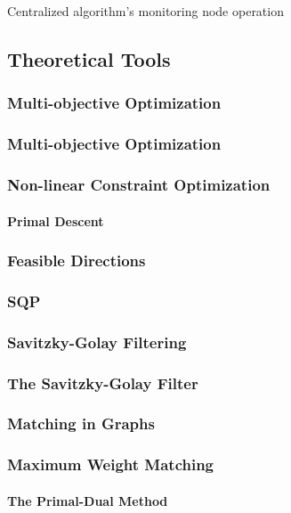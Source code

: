 \documentclass[hyperref={pdfpagelabels=false}]{beamer}
\begin{document}
\begin{frame}[plain]
{\begin{minipage}{\linewidth}
\begin{algorithm}[H]
{{{		


		}
	}
}
\caption{Centralized algorithm's monitoring node operation \label{algo:centralizedMonitoringNode}} 
\end{algorithm}
\end{minipage}%
}
\end{frame}

\subsection{Theoretical Tools}
\subsubsection*{Multi-objective Optimization}
\begin{frame} \frametitle{Multi-objective Optimization}

\end{frame}
\begin{frame} \frametitle{Non-linear Constraint Optimization}\framesubtitle{Primal Descent}

\end{frame}
\begin{frame} \frametitle{Feasible Directions}

\end{frame}
\begin{frame} \frametitle{SQP}

\end{frame}
\subsubsection*{Savitzky-Golay Filtering}
\begin{frame} \frametitle{The Savitzky-Golay Filter}

\end{frame}
\subsubsection*{Matching in Graphs}
\begin{frame} \frametitle{Maximum Weight Matching}\framesubtitle{The Primal-Dual Method}

\end{frame}
\end{document}
